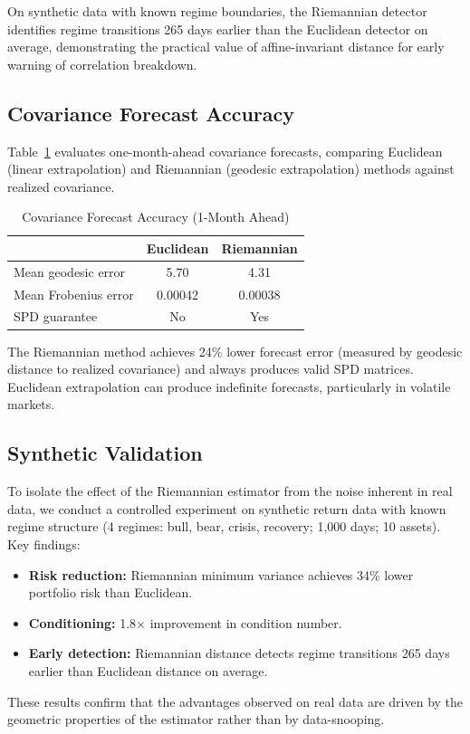 \documentclass[12pt,a4paper]{article}
\begin{document}
On synthetic data with known regime boundaries, the Riemannian detector
identifies regime transitions 265 days earlier than the Euclidean detector
on average, demonstrating the practical value of affine-invariant distance
for early warning of correlation breakdown.

\subsection{Covariance Forecast Accuracy}

Table~\ref{tab:forecast} evaluates one-month-ahead covariance forecasts,
comparing Euclidean (linear extrapolation) and Riemannian (geodesic
extrapolation) methods against realized covariance.

\begin{table}[htbp]
\centering
\caption{Covariance Forecast Accuracy (1-Month Ahead)}
\label{tab:forecast}
\begin{tabular}{lcc}
\toprule
 & Euclidean & Riemannian \\
\midrule
Mean geodesic error       & 5.70 & 4.31 \\
Mean Frobenius error      & 0.00042 & 0.00038 \\
SPD guarantee             & No  & Yes \\
\bottomrule
\end{tabular}
\medskip

{\small The Riemannian method achieves 24\% lower forecast error
(measured by geodesic distance to realized covariance) and always
produces valid SPD matrices. Euclidean extrapolation can produce
indefinite forecasts, particularly in volatile markets.}
\end{table}

\subsection{Synthetic Validation}

To isolate the effect of the Riemannian estimator from the noise inherent in
real data, we conduct a controlled experiment on synthetic return data with
known regime structure (4 regimes: bull, bear, crisis, recovery; 1,000 days;
10 assets). Key findings:
\begin{itemize}
    \item \textbf{Risk reduction:} Riemannian minimum variance achieves 34\%
    lower portfolio risk than Euclidean.
    \item \textbf{Conditioning:} 1.8$\times$ improvement in condition number.
    \item \textbf{Early detection:} Riemannian distance detects regime
    transitions 265 days earlier than Euclidean distance on average.
\end{itemize}
These results confirm that the advantages observed on real data are driven by
the geometric properties of the estimator rather than by data-snooping.
\end{document}
